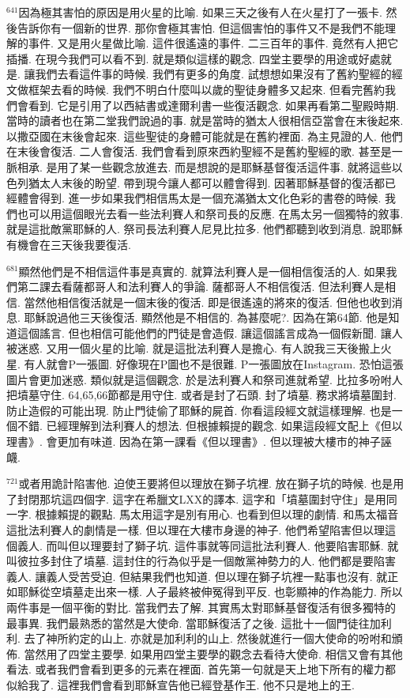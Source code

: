 \documentclass{book}
\begin{document}
$^{641}$因為極其害怕的原因是用火星的比喻.
如果三天之後有人在火星打了一張卡.
然後告訴你有一個新的世界.
那你會極其害怕.
但這個害怕的事件又不是我們不能理解的事件.
又是用火星做比喻.
這件很遙遠的事件.
二三百年的事件.
竟然有人把它插播.
在現今我們可以看不到.
就是類似這樣的觀念.
四堂主要學的用途或好處就是.
讓我們去看這件事的時候.
我們有更多的角度.
試想想如果沒有了舊約聖經的經文做框架去看的時候.
我們不明白什麼叫以歲的聖徒身體多又起來.
但看完舊約我們會看到.
它是引用了以西結書或達爾利書一些復活觀念.
如果再看第二聖殿時期.
當時的讀者也在第二堂我們說過的事.
就是當時的猶太人很相信亞當會在末後起來.
以撒亞國在末後會起來.
這些聖徒的身體可能就是在舊約裡面.
為主見證的人.
他們在末後會復活.
二人會復活.
我們會看到原來西約聖經不是舊約聖經的歌.
甚至是一脈相承.
是用了某一些觀念放進去.
而是想說的是耶穌基督復活這件事.
就將這些以色列猶太人末後的盼望.
帶到現今讓人都可以體會得到.
因著耶穌基督的復活都已經體會得到.
進一步如果我們相信馬太是一個充滿猶太文化色彩的書卷的時候.
我們也可以用這個眼光去看一些法利賽人和祭司長的反應.
在馬太另一個獨特的敘事.
就是這批敵黨耶穌的人.
祭司長法利賽人尼見比拉多.
他們都聽到收到消息.
說耶穌有機會在三天後我要復活.

$^{681}$顯然他們是不相信這件事是真實的.
就算法利賽人是一個相信復活的人.
如果我們第二課去看薩都哥人和法利賽人的爭論.
薩都哥人不相信復活.
但法利賽人是相信.
當然他相信復活就是一個末後的復活.
即是很遙遠的將來的復活.
但他也收到消息.
耶穌說過他三天後復活.
顯然他是不相信的.
為甚麼呢?.
因為在第64節.
他是知道這個謠言.
但也相信可能他們的門徒是會造假.
讓這個謠言成為一個假新聞.
讓人被迷惑.
又用一個火星的比喻.
就是這批法利賽人是擔心.
有人說我三天後搬上火星.
有人就會P一張圖.
好像現在P圖也不是很難.
P一張圖放在Instagram.
恐怕這張圖片會更加迷惑.
類似就是這個觀念.
於是法利賽人和祭司進就希望.
比拉多吩咐人把墳墓守住.
64,65,66節都是用守住.
或者是封了石頭.
封了墳墓.
務求將墳墓圍封.
防止造假的可能出現.
防止門徒偷了耶穌的屍首.
你看這段經文就這樣理解.
也是一個不錯.
已經理解到法利賽人的想法.
但根據賴提的觀念.
如果這段經文配上《但以理書》.
會更加有味道.
因為在第一課看《但以理書》.
但以理被大樓市的神子誣衊.

$^{721}$或者用詭計陷害他.
迫使王要將但以理放在獅子坑裡.
放在獅子坑的時候.
也是用了封閉那坑這四個字.
這字在希臘文LXX的譯本.
這字和「墳墓圍封守住」是用同一字.
根據賴提的觀點.
馬太用這字是別有用心.
也看到但以理的劇情.
和馬太福音這批法利賽人的劇情是一樣.
但以理在大樓市身邊的神子.
他們希望陷害但以理這個義人.
而叫但以理要封了獅子坑.
這件事就等同這批法利賽人.
他要陷害耶穌.
就叫彼拉多封住了墳墓.
這封住的行為似乎是一個敵黨神勢力的人.
他們都是要陷害義人.
讓義人受苦受迫.
但結果我們也知道.
但以理在獅子坑裡一點事也沒有.
就正如耶穌從空墳墓走出來一樣.
人子最終被伸冤得到平反.
也彰顯神的作為能力.
所以兩件事是一個平衡的對比.
當我們去了解.
其實馬太對耶穌基督復活有很多獨特的最事異.
我們最熟悉的當然是大使命.
當耶穌復活了之後.
這批十一個門徒往加利利.
去了神所約定的山上.
亦就是加利利的山上.
然後就進行一個大使命的吩咐和頒佈.
當然用了四堂主要學.
如果用四堂主要學的觀念去看待大使命.
相信又會有其他看法.
或者我們會看到更多的元素在裡面.
首先第一句就是天上地下所有的權力都似給我了.
這裡我們會看到耶穌宣告他已經登基作王.
他不只是地上的王.
\end{document}
